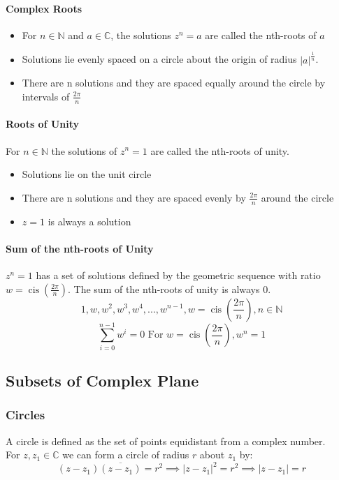 \documentclass[a4paper,twoside,10pt]{article}
\DeclareMathOperator\cis{cis}
\begin{document}
			\paragraph{Complex Roots}
			\begin{itemize}
				\item For $n\in\mathbb{N}$ and $a\in\mathbb{C}$, the solutions $z^n=a$ are called the nth-roots of $a$
				\item Solutions lie evenly spaced on a circle about the origin of radius $|a|^{\frac{1}{n}}$.
				\item There are n solutions and they are spaced equally around the circle by intervals of $\frac{2\pi}{n}$
			\end{itemize}
			
			\paragraph{Roots of Unity} For $n\in\mathbb{N}$ the solutions of $z^n=1$ are called the nth-roots of unity.
			\begin{itemize}
				\item Solutions lie on the unit circle
				\item There are n solutions and they are spaced evenly by $\frac{2\pi}{n}$ around the circle
				\item $z=1$ is always a solution
			\end{itemize}
		
			\paragraph{Sum of the nth-roots of Unity} $z^n=1$ has a set of solutions defined by the geometric sequence with ratio $w=\cis\left(\frac{2\pi}{n}\right)$. The sum of the nth-roots of unity is always 0.
			\[
				1,w,w^2,w^3,w^4,...,w^{n-1},w=\cis\left(\frac{2\pi}{n}\right),n\in\mathbb{N}
			\]
			\[
				\sum\limits_{i=0}^{n-1}w^i=0 \text{ For }w=\cis\left(\frac{2\pi}{n}\right),w^n=1
			\]
		\subsection{Subsets of Complex Plane}
			\subsubsection{Circles}
				A circle is defined as the set of points equidistant from a complex number.\\
				For $z,z_1\in\mathbb{C}$ we can form a circle of radius $r$ about $z_1$ by:
				\[
					\left(z-z_1\right)\overline{\left(z-z_1\right)}=r^2\implies |z-z_1|^2=r^2 \implies |z-z_1|=r
				\]
\end{document}
